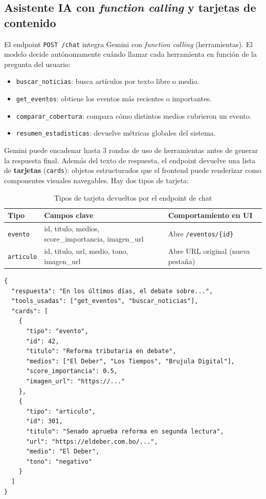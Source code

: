 \documentclass[12pt,a4paper]{article}
\begin{document}
\subsection*{Asistente IA con \textit{function calling} y tarjetas de contenido}

El endpoint \texttt{POST /chat} integra Gemini con \textit{function calling} (herramientas). El modelo decide autónomamente cuándo llamar cada herramienta en función de la pregunta del usuario:

\begin{itemize}[nosep]
  \item \texttt{buscar\_noticias}: busca artículos por texto libre o medio.
  \item \texttt{get\_eventos}: obtiene los eventos más recientes o importantes.
  \item \texttt{comparar\_cobertura}: compara cómo distintos medios cubrieron un evento.
  \item \texttt{resumen\_estadisticas}: devuelve métricas globales del sistema.
\end{itemize}

Gemini puede encadenar hasta 3 rondas de uso de herramientas antes de generar la respuesta final. Además del texto de respuesta, el endpoint devuelve una lista de \textbf{tarjetas} (\texttt{cards}): objetos estructurados que el frontend puede renderizar como componentes visuales navegables. Hay dos tipos de tarjeta:

\begin{table}[H]
\centering
\caption{Tipos de tarjeta devueltos por el endpoint de chat}
\begin{tabular}{@{}lll@{}}
\toprule
\rowcolor{azulAS!15}
\textbf{Tipo} & \textbf{Campos clave} & \textbf{Comportamiento en UI} \\
\midrule
\texttt{evento} & id, titulo, medios, score\_importancia, imagen\_url & Abre \texttt{/eventos/\{id\}} \\
\rowcolor{grisCelda}
\texttt{articulo} & id, titulo, url, medio, tono, imagen\_url & Abre URL original (nueva pestaña) \\
\bottomrule
\end{tabular}
\end{table}

\begin{lstlisting}[caption=Estructura de respuesta del endpoint /chat]
{
  "respuesta": "En los últimos días, el debate sobre...",
  "tools_usadas": ["get_eventos", "buscar_noticias"],
  "cards": [
    {
      "tipo": "evento",
      "id": 42,
      "titulo": "Reforma tributaria en debate",
      "medios": ["El Deber", "Los Tiempos", "Brujula Digital"],
      "score_importancia": 0.5,
      "imagen_url": "https://..."
    },
    {
      "tipo": "articulo",
      "id": 301,
      "titulo": "Senado aprueba reforma en segunda lectura",
      "url": "https://eldeber.com.bo/...",
      "medio": "El Deber",
      "tono": "negativo"
    }
  ]
}
\end{lstlisting}
\end{document}
